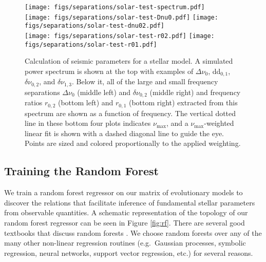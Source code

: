 \documentclass[twocolumn,twocolappendix]{aastex6}
\begin{document}
\begin{figure*}
    \centering
    \texttt{[image: figs/separations/solar-test-spectrum.pdf]}\\
    \texttt{[image: figs/separations/solar-test-Dnu0.pdf]}\hfill
    \texttt{[image: figs/separations/solar-test-dnu02.pdf]}\\
    \texttt{[image: figs/separations/solar-test-r02.pdf]}\hfill
    \texttt{[image: figs/separations/solar-test-r01.pdf]}\\
    \caption{Calculation of seismic parameters for a stellar model. %
    A simulated power spectrum is shown at the top with examples of $\Delta\nu_0$, dd$_{0,1}$, $\delta\nu_{0,2}$, and $\delta\nu_{1,3}$. Below it, all of the large and small frequency separations $\Delta\nu_0$ (middle left) and $\delta\nu_{0,2}$ (middle right) and frequency ratios $r_{0,2}$ (bottom left) and $r_{0,1}$ (bottom right) extracted from this spectrum are shown as a function of frequency. The vertical dotted line in these bottom four plots indicates $\nu_{\max}$, and a $\nu_{\max}$-weighted linear fit is shown with a dashed diagonal line to guide the eye. Points are sized and colored proportionally to the applied weighting. }%
    \label{fig:ratios}
\end{figure*}

\subsection{Training the Random Forest} \label{sec:forest}
We train a random forest regressor on our matrix of evolutionary models to discover the relations that facilitate inference of fundamental stellar parameters from observable quantities. A schematic representation of the topology of our random forest regressor can be seen in Figure \ref{fig:rf}. There are several good textbooks that discuss random forests \citep[see e.g.][Chapter 15]{hastie2005elements}. We choose random forests over any of the many other non-linear regression routines (e.g.\ Gaussian processes, symbolic regression, neural networks, support vector regression, etc.) for several reasons. 
\end{document}
